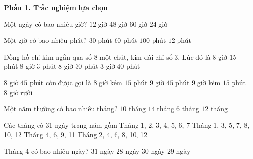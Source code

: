\textbf{Phần 1. Trắc nghiệm lựa chọn}

\begin{ex} %
Một ngày có bao nhiêu giờ?
\choice
{$12$ giờ}
{$48$ giờ}
{$60$ giờ}
{\True $24$ giờ}
\end{ex}

\begin{ex} %
Một giờ có bao nhiêu phút?
\choice
{$30$ phút}
{\True $60$ phút}
{$100$ phút}
{$12$ phút}
\end{ex}

\begin{ex} %
Đồng hồ chỉ kim ngắn qua số 8 một chút, kim dài chỉ số 3. Lúc đó là
\choice
{\True $8$ giờ $15$ phút}
{$8$ giờ $3$ phút}
{$8$ giờ $30$ phút}
{$3$ giờ $40$ phút}
\end{ex}

\begin{ex} %
$8$ giờ $45$ phút còn được gọi là
\choice
{$8$ giờ kém $15$ phút}
{$9$ giờ $45$ phút}
{\True $9$ giờ kém $15$ phút}
{$8$ giờ rưỡi}
\end{ex}

\begin{ex} %
Một năm thường có bao nhiêu tháng?
\choice
{$10$ tháng}
{$14$ tháng}
{$6$ tháng}
{\True $12$ tháng}
\end{ex}

\begin{ex} %
Các tháng có 31 ngày trong năm gồm
\choice
{Tháng 1, 2, 3, 4, 5, 6, 7}
{\True Tháng 1, 3, 5, 7, 8, 10, 12}
{Tháng 4, 6, 9, 11}
{Tháng 2, 4, 6, 8, 10, 12}
\end{ex}

\begin{ex} %
Tháng 4 có bao nhiêu ngày?
\choice
{$31$ ngày}
{$28$ ngày}
{\True $30$ ngày}
{$29$ ngày}
\end{ex}

